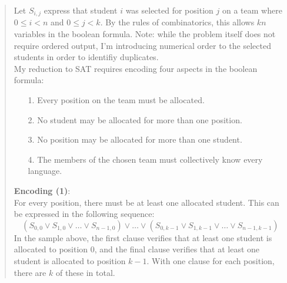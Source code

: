 \documentclass[11pt]{article}
\begin{document}
\begin{enumerate}
\begin{enumerate}
\begin{quote}
    Let $S_{i,j}$ express that student $i$ was selected for position $j$ on a team where $0 \leq i < n$ and $0 \leq j < k$. By the rules of combinatorics, this allows $kn$ variables in the boolean formula. Note: while the problem itself does not require ordered output, I'm introducing numerical order to the selected students in order to identifiy duplicates. \\

    My reduction to SAT requires encoding four aspects in the boolean formula: 
    \begin{enumerate}
        \item[1.] Every position on the team must be allocated.
        \item[2.] No student may be allocated for more than one position.
        \item[3.] No position may be allocated for more than one student.
        \item[4.] The members of the chosen team must collectively know every language.
    \end{enumerate}
    \vspace{1em}

    \textbf{Encoding (1)}: \\
    For every position, there must be at least one allocated student. This can be expressed in the following sequence: 
    $$(S_{0, 0} \lor S_{1, 0} \lor \dots \lor S_{n - 1, 0}) \lor \dots \lor (S_{0, k - 1} \lor S_{1, k - 1} \lor \dots \lor S_{n - 1, k - 1})$$
    In the sample above, the first clause verifies that at least one student is allocated to position $0$, and the final clause verifies that at least one student is allocated to position $k - 1$. With one clause for each position, there are $k$ of these in total. \\


\end{quote}
\end{enumerate}
\end{enumerate}
\end{document}
